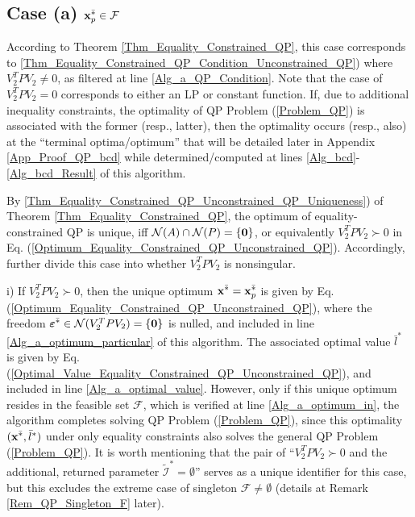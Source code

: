 \documentclass{imaman}
\newcommand{\bfx}{{\bf x}}
\newcommand{\bfvarepsilon}{{\boldsymbol \varepsilon}}
\newcommand{\bfzero}{{\bf 0}}
\newcommand{\calF}{{\mathcal F}}
\newcommand{\calI}{{\mathcal I}}
\newcommand{\calN}{{\mathcal N}}
\numberwithin{equation}{section}
\begin{document}
\vspace{-0.3cm}\subsection{Case (a) $\bfx_p^{\bar *}\in\calF$}
\label{App_Proof_QP_a}\vspace{-0.2cm}
According to Theorem \ref{Thm_Equality_Constrained_QP}, this case corresponds to \ref{Thm_Equality_Constrained_QP_Condition_Unconstrained_QP}) where $V_2^TPV_2\ne 0$, as filtered at line \ref{Alg_a_QP_Condition}. Note that the case of $V_2^TPV_2=0$ corresponds to either an LP or constant function. If, due to additional inequality constraints, the optimality of QP Problem (\ref{Problem_QP}) is associated with the former (resp., latter), then the optimality occurs (resp., also) at the ``terminal optima/optimum'' that will be detailed later in Appendix \ref{App_Proof_QP_bcd} while determined/computed at lines \ref{Alg_bcd}-\ref{Alg_bcd_Result} of this algorithm.

By \ref{Thm_Equality_Constrained_QP_Unconstrained_QP_Uniqueness}) of Theorem \ref{Thm_Equality_Constrained_QP}, the optimum of equality-constrained QP is unique, iff $\calN(A)\cap\calN(P)=\{\bfzero\}$, or equivalently $V_2^TPV_2\succ 0$ in Eq. (\ref{Optimum_Equality_Constrained_QP_Unconstrained_QP}). Accordingly, further divide this case into whether $V_2^TPV_2$ is nonsingular.\vspace{0.16cm}

\vspace{-0.1cm}\noindent i) If $V_2^TPV_2\succ 0$, then the unique optimum $\bfx^{\bar *}=\bfx_p^{\bar *}$ is given by Eq. (\ref{Optimum_Equality_Constrained_QP_Unconstrained_QP}), where the freedom $\bfvarepsilon^{\bar *}\in\calN(V_2^TPV_2)=\{\bfzero\}$ is nulled, and included in line \ref{Alg_a_optimum_particular} of this algorithm. The associated optimal value $\bar l^*$ is given by Eq. (\ref{Optimal_Value_Equality_Constrained_QP_Unconstrained_QP}), and included in line \ref{Alg_a_optimal_value}. However, only if this unique optimum resides in the feasible set $\calF$, which is verified at line \ref{Alg_a_optimum_in}, the algorithm completes solving QP Problem (\ref{Problem_QP}), since this optimality $(\bfx^{\bar *},\bar l^*)$ under only equality constraints also solves the general QP Problem (\ref{Problem_QP}). It is worth mentioning that the pair of ``$V_2^TPV_2\succ 0$ and the additional, returned parameter $\tilde\calI^*=\emptyset$'' serves as a unique identifier for this case, but this excludes the extreme case of singleton $\calF\ne\emptyset$ (details at Remark \ref{Rem_QP_Singleton_F} later).\vspace{0.16cm}
\end{document}
